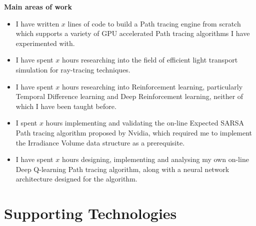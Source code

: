 \documentclass[ %
                    author={Callum Pearce},
                supervisor={Dr. Neill Campbell},
                    degree={MEng},
                     title={How effective are Temporal difference learning methods for reducing the number of zero contribution light paths while still accurately approximating Global Illumination in Path tracing?},
                  subtitle={},
                      type={research},
                      year={2019} ]{dissertation}
\begin{document}
\noindent
\textbf{Main areas of work}
\begin{itemize}
\item I have written $x$ lines of code to build a  Path tracing engine from scratch which supports a variety of GPU accelerated Path tracing algorithms I have experimented with.

\item I have spent $x$ hours researching into the field of efficient light transport simulation for ray-tracing techniques.

\item I have spent $x$ hours researching into Reinforcement learning, particularly Temporal Difference learning and Deep Reinforcement learning, neither of which I have been taught before.

\item I spent $x$ hours implementing and validating the on-line Expected SARSA Path tracing algorithm proposed by Nvidia, which required me to implement the Irradiance Volume data structure as a prerequisite.

\item I have spent $x$ hours designing, implementing and analysing my own on-line Deep Q-learning Path tracing algorithm, along with a neural network architecture
designed for the algorithm.

\end{itemize}



\chapter*{Supporting Technologies}
\end{document}
